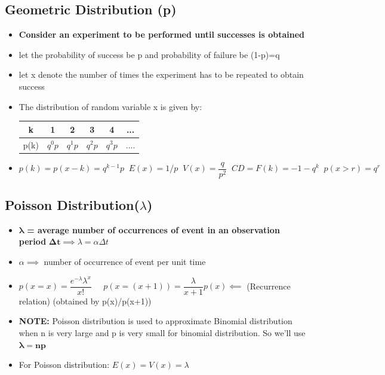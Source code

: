\documentclass[8pt]{report}
\begin{document}
		\subsection{Geometric Distribution (p)}
			\begin{itemize}
				\item \textbf{Consider an experiment to be performed until successes is obtained} 
				\item let the probability of success be p and probability of failure be (1-p)=q
				\item let x denote the number of times the experiment has to be repeated to obtain success
				\item The distribution of random variable x is given by:
				\begin{table}[H]
					\centering
					\def\arraystretch{1.5}
					\begin{tabular}{|c|c|c|c|c|c|}
						\hline
						k & 1 & 2 & 3 & 4 & ...\\
						\hline
						p(k) & $q^0p$ & $q^1p$ & $q^2p$ & $q^3p$ & ....\\
						\hline
					\end{tabular}
				\end{table}
				\item $\boxed{p(k) = p(x-k) = q^{k-1}p}\;\;\boxed{E(x) = 1/p}\;\;\boxed{V(x)=\dfrac{q}{p^2}}\;\;\boxed{CD = F(k)=-1-q^k}\;\;\boxed{p(x>r)=q^r}$
			\end{itemize}\hrulefill
		\subsection{Poisson Distribution($\lambda$)}
			\begin{itemize}
				\item $\pmb{\lambda}$ \textbf{= average number of occurrences of event in an observation period} $\pmb{\Delta t}\implies \boxed{\lambda = \alpha\Delta t}$ 
				\item $\alpha \implies$ number of occurrence of event per unit time
				\item $\boxed{p(x=x)=\dfrac{e^{-\lambda}\lambda^x}{x!}}\;\;\;\;\;\boxed{p(x=(x+1)) = \dfrac{\lambda}{x+1}p(x)}\impliedby$ (Recurrence relation) (obtained by p(x)/p(x+1))
				\item \textbf{NOTE: } Poisson distribution is used to approximate Binomial distribution when n is very large and p is very small for binomial distribution. So we'll use $\boxed{\pmb{\lambda = np}}$
				\item For Poisson distribution: $E(x) = V(x) = \lambda$
			\end{itemize}\hrulefill
\end{document}
